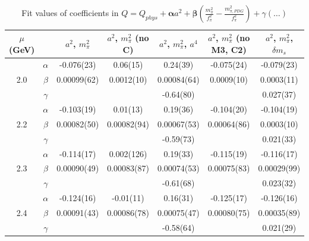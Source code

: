 \documentclass[12pt]{extarticle}
\begin{document}
\begin{table}[h!]
\begin{center}
\begin{tabular}{|c c|c|c|c|c|c|}
\hline
$\mu$ (GeV) &  & $a^2$, $m_\pi^2$& $a^2$, $m_\pi^2$ (no C)& $a^2$, $m_\pi^2$, $a^4$& $a^2$, $m_\pi^2$ (no M3, C2)& $a^2$, $m_\pi^2$, $\delta m_s$\\
\hline
\multirow{3}{0.5in}{2.0} & $\alpha$ & -0.076(23)& 0.06(15)& 0.24(39)& -0.075(24)& -0.079(23)\\
 & $\beta$ & 0.00099(62)& 0.0012(10)& 0.00084(64)& 0.0009(10)& 0.0003(11)\\
 & $\gamma$ &  &  & -0.64(80)&  & 0.027(37)\\
\hline
\multirow{3}{0.5in}{2.2} & $\alpha$ & -0.103(19)& 0.01(13)& 0.19(36)& -0.104(20)& -0.104(19)\\
 & $\beta$ & 0.00082(50)& 0.00082(94)& 0.00067(53)& 0.00064(86)& 0.0003(10)\\
 & $\gamma$ &  &  & -0.59(73)&  & 0.021(33)\\
\hline
\multirow{3}{0.5in}{2.3} & $\alpha$ & -0.114(17)& 0.002(126)& 0.19(33)& -0.115(19)& -0.116(17)\\
 & $\beta$ & 0.00090(49)& 0.00083(87)& 0.00074(53)& 0.00075(83)& 0.00029(99)\\
 & $\gamma$ &  &  & -0.61(68)&  & 0.023(32)\\
\hline
\multirow{3}{0.5in}{2.4} & $\alpha$ & -0.124(16)& -0.01(11)& 0.16(31)& -0.125(17)& -0.126(16)\\
 & $\beta$ & 0.00091(43)& 0.00086(78)& 0.00075(47)& 0.00080(75)& 0.00035(89)\\
 & $\gamma$ &  &  & -0.58(64)&  & 0.021(29)\\
\hline
\end{tabular}
\caption{Fit values of coefficients in $Q = Q_{phys} + \mathbf{\alpha} a^2 + \mathbf{\beta}\left(\frac{m_\pi^2}{f_\pi^2}-\frac{m_{\pi,PDG}^2}{f_\pi^2}\right) + \gamma(\ldots)$}
\end{center}
\end{table}




















\clearpage
\end{document}
